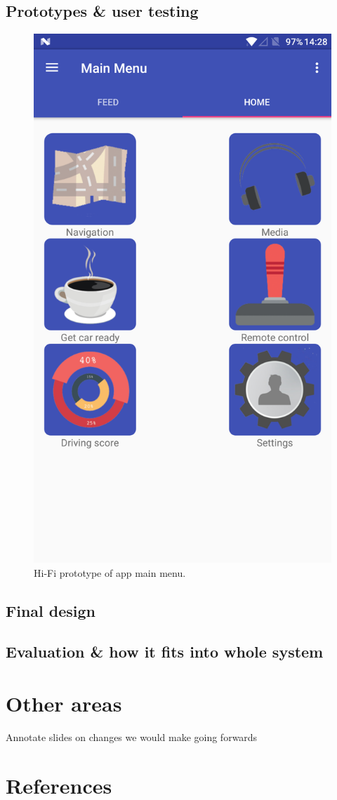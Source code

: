 \documentclass{article}
\begin{document}
\subsection{Prototypes \& user testing}
  \begin{figure}[H]
    \centering
    \includegraphics[scale=0.25]{main-menu}
    \caption{Hi-Fi prototype of app main menu.}
    \label{main-menu}
  \end{figure}
\subsection{Final design}

\subsection{Evaluation \& how it fits into whole system}

\section{Other areas}

Annotate slides on changes we would make going forwards
\section{References}

\end{document}
